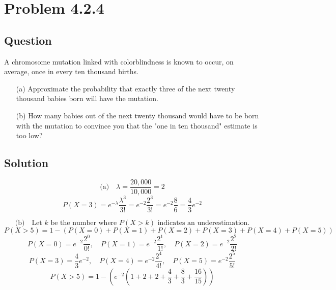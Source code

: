 \documentclass[12pt]{article}
\begin{document}
\section*{Problem 4.2.4}
\subsection*{Question}
A chromosome mutation linked with colorblindness is known to occur, on average, once in every ten thousand births.
\begin{itemize}
    \item[(a)] Approximate the probability that exactly three of the next twenty thousand babies born will have the mutation.
    \item[(b)] How many babies out of the next twenty thousand would have to be born with the mutation to convince you that the "one in ten thousand" estimate is too low?
\end{itemize}

\subsection*{Solution}
\[
\text{(a)} \quad \lambda = \frac{20,000}{10,000} = 2  %
\]
\[
P(X = 3) = e^{-\lambda} \frac{\lambda^3}{3!} = e^{-2} \frac{2^3}{3!} = e^{-2} \frac{8}{6} = \frac{4}{3} e^{-2}
\]

\[
\text{(b)} \quad \text{Let } k \text{ be the number where } P(X > k) \text{ indicates an underestimation.}
\]
\[
P(X > 5) = 1 - (P(X = 0) + P(X = 1) + P(X = 2) + P(X = 3) + P(X = 4) + P(X = 5))
\]
\[
P(X = 0) = e^{-2} \frac{2^0}{0!}, \quad P(X = 1) = e^{-2} \frac{2^1}{1!}, \quad P(X = 2) = e^{-2} \frac{2^2}{2!}
\]
\[
P(X = 3) = \frac{4}{3} e^{-2}, \quad P(X = 4) = e^{-2} \frac{2^4}{4!}, \quad P(X = 5) = e^{-2} \frac{2^5}{5!}
\]
\[
P(X > 5) = 1 - \left( e^{-2} (1 + 2 + 2 + \frac{4}{3} + \frac{8}{3} + \frac{16}{15}) \right)
\]
\pagebreak
\end{document}
